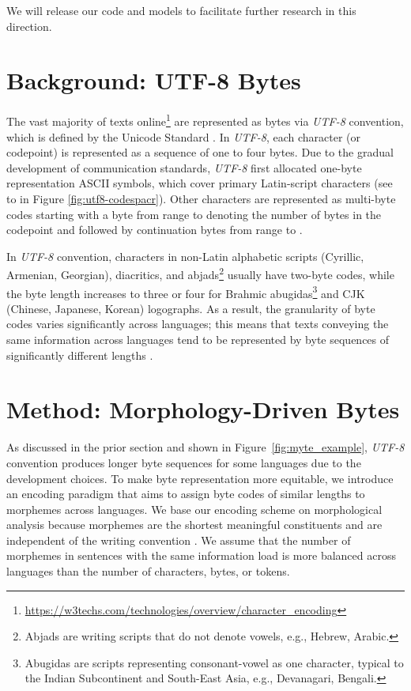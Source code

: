 We will release our code and models to facilitate further research in this direction.

\section{Background: UTF-8 Bytes}

\label{sec:utf8-bg}

The vast majority of texts online\footnote{\url{https://w3techs.com/technologies/overview/character_encoding}} are represented as bytes via \emph{UTF-8} convention, which is defined by the Unicode Standard \cite{the_unicode_consortium_unicode_2011}. In \emph{UTF-8}, each character (or codepoint) is represented as a sequence of one to four bytes. Due to the gradual development of communication standards, \emph{UTF-8} first allocated one-byte representation ASCII symbols, which cover primary Latin-script characters (see  to  in Figure \ref{fig:utf8-codespacr}).
Other characters are represented as multi-byte codes starting with a byte from range  to  denoting the number of bytes in the codepoint and followed by continuation bytes from range  to .

In \emph{UTF-8} convention, characters in non-Latin alphabetic scripts (Cyrillic, Armenian, Georgian), diacritics, and abjads\footnote{Abjads are writing scripts that do not denote vowels, e.g., Hebrew, Arabic.} usually have two-byte codes, while the byte length increases to three or four for Brahmic abugidas\footnote{Abugidas are scripts representing consonant-vowel as one character, typical to the Indian Subcontinent and South-East Asia, e.g., Devanagari, Bengali.} and CJK (Chinese, Japanese, Korean) logographs. As a result, the granularity of byte codes varies significantly across languages; this means that texts conveying the same information across languages tend to be represented by byte sequences of significantly different lengths \cite{arnett2024bit}.

\section{Method: Morphology-Driven Bytes}

As discussed in the prior section and shown in Figure~\ref{fig:myte_example}, \emph{UTF-8} convention produces longer byte sequences for some languages due to the development choices. To make byte representation more equitable, we introduce an encoding paradigm that aims to assign byte codes of similar lengths to morphemes across languages. We base our encoding scheme on morphological analysis because morphemes are the shortest meaningful constituents and are independent of the writing convention \cite{haspelmath_understanding_2010}. We assume that the number of morphemes in sentences with the same information load is more balanced across languages than the number of characters, bytes, or tokens.

